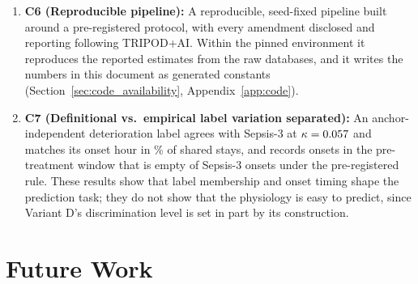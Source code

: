 \begin{enumerate}
    \item \textbf{C6 (Reproducible pipeline):} A reproducible, seed-fixed
    pipeline built around a pre-registered protocol, with every amendment
    disclosed and reporting following TRIPOD+AI. Within the pinned environment
    it reproduces the reported estimates from the raw databases, and it writes
    the numbers in this document as generated constants
    (Section~\ref{sec:code_availability}, Appendix~\ref{app:code}).

    \item \textbf{C7 (Definitional vs.\ empirical label variation
    separated):} An anchor-independent deterioration label agrees with
    Sepsis-3 at $\kappa = 0.057$ and matches its onset hour in
    \pcPctExactMatchD\% of shared stays, and records \pcPreTreatOnsetsVarD{}
    onsets in the pre-treatment window that is empty of Sepsis-3 onsets under
    the pre-registered rule. These results show that label membership and
    onset timing shape the prediction task; they do not show that the
    physiology is easy to predict, since Variant D's discrimination level is
    set in part by its construction.
\end{enumerate}


\section{Future Work}

